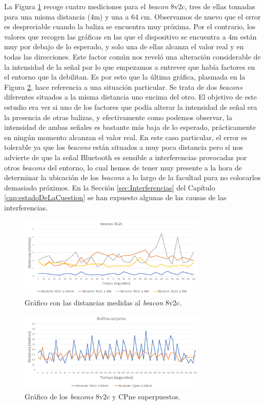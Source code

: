 La Figura \ref{fig:dist_8v2c} recoge cuatro mediciones para el \textit{beacon} 8v2c, tres de ellas tomadas para una misma distancia (4m) y una a 64 cm. Observamos de nuevo que el error es despreciable cuando la baliza se encuentra muy próxima. Por el contrario, los valores que recogen las gráficas en las que el dispositivo se encuentra a 4m están muy por debajo de lo esperado, y solo una de ellas alcanza el valor real y en todas las direcciones. Este factor común nos reveló una alteración considerable de la intensidad de la señal por lo que empezamos a entrever que había factores en el entorno que la debilitan. Es por esto que la última gráfica, plasmada en la Figura \ref{fig:dist_conjunto}, hace referencia a una situación particular. Se trata de dos \textit{beacons} diferentes situados a la misma distancia uno encima del otro. El objetivo de este estudio era ver si uno de los factores que podía alterar la intensidad de señal era la presencia de otras balizas, y efectivamente como podemos observar, la intensidad de ambas señales es bastante más baja de lo esperado, prácticamente en ningún momento alcanzan el valor real. En este caso particular, el error es tolerable ya que los \textit{beacons} están situados a muy poca distancia pero sí nos advierte de que la señal Bluetooth es sensible a interferencias provocadas por otros \textit{beacons} del entorno, lo cual hemos de tener muy presente a la hora de determinar la ubicación de los \textit{beacons} a lo largo de la facultad para no colocarlos demasiado próximos. En la Sección \ref{sec:Interferencias} del Capítulo \ref{cap:estadoDeLaCuestion} se han expuesto algunas de las causas de las interferencias.
\begin{figure}[t]
	\centering
	\includegraphics[width=0.8\textwidth]{Imagenes/Descripciondeltrabajo/dist_8v2c}
	\caption{Gráfico con las distancias medidas al \textit{beacon} 8v2c. }
	\label{fig:dist_8v2c}
\end{figure}
\begin{figure}[t]
	\centering
	\includegraphics[width=0.8\textwidth]{Imagenes/Descripciondeltrabajo/dist_conjunto}
	\caption{Gráfico de los \textit{beacons} 8v2c y CPne superpuestos. }
	\label{fig:dist_conjunto}
\end{figure}

